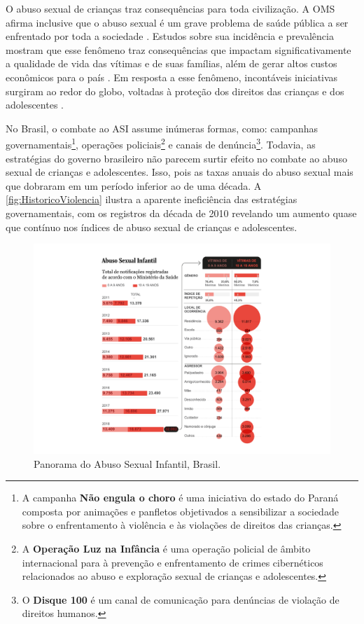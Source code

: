 O abuso sexual de crianças traz consequências para toda civilização. A \ac{OMS} afirma inclusive que o abuso sexual é um grave problema de saúde pública a ser enfrentado por toda a sociedade \cite{OMS2017responding}. Estudos sobre sua incidência e prevalência mostram que esse fenômeno traz consequências que impactam significativamente a qualidade de vida das vítimas e de suas famílias, além de gerar altos custos econômicos para o país \cite{pinto2017avaliaccao}. Em resposta a esse fenômeno, incontáveis iniciativas surgiram ao redor do globo, voltadas à proteção dos direitos das crianças e dos adolescentes \cite{finkelhor2009prevention}.

No Brasil, o combate ao \ac{ASI} assume inúmeras formas, como: campanhas governamentais\footnote{A campanha \textbf{Não engula o choro} é uma iniciativa do estado do Paraná composta por animações e panfletos objetivados a sensibilizar a sociedade sobre o enfrentamento à violência e às violações de direitos das crianças.}, operações policiais\footnote{A \textbf{Operação Luz na Infância} é uma operação policial de âmbito internacional para à prevenção e enfrentamento de crimes cibernéticos relacionados ao abuso e exploração sexual de crianças e adolescentes.} e canais de denúncia\footnote{O \textbf{Disque 100} é um canal de comunicação para denúncias de violação de direitos humanos.}. Todavia, as estratégias do governo brasileiro não parecem surtir efeito no combate ao abuso sexual de crianças e adolescentes. Isso, pois as taxas anuais do abuso sexual mais que dobraram em um período inferior ao de uma década. A \autoref{fig:HistoricoViolencia} ilustra a aparente ineficiência das estratégias governamentais, com os registros da década de 2010 revelando um aumento quase que contínuo nos índices de abuso sexual de crianças e adolescentes.

\begin{figure}[!t]
	\caption{Panorama do Abuso Sexual Infantil, Brasil.}\label{fig:HistoricoViolencia}
    \hspace{-4.8 cm}
    \includegraphics[width=1.6\linewidth]{./Visuais/HistoricoViolencia.pdf}
  	\vspace{-1.0cm}
\end{figure}

